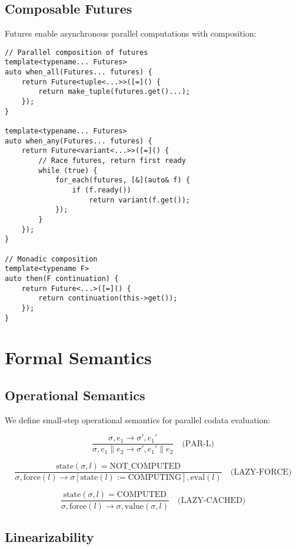 \documentclass[sigconf,review,anonymous]{acmart}
\begin{document}
\subsection{Composable Futures}

Futures enable asynchronous parallel computations with composition:

\begin{lstlisting}
// Parallel composition of futures
template<typename... Futures>
auto when_all(Futures... futures) {
    return Future<tuple<...>>([=]() {
        return make_tuple(futures.get()...);
    });
}

template<typename... Futures>  
auto when_any(Futures... futures) {
    return Future<variant<...>>([=]() {
        // Race futures, return first ready
        while (true) {
            for_each(futures, [&](auto& f) {
                if (f.ready()) 
                    return variant(f.get());
            });
        }
    });
}

// Monadic composition
template<typename F>
auto then(F continuation) {
    return Future<...>([=]() {
        return continuation(this->get());
    });
}
\end{lstlisting}

\section{Formal Semantics}

\subsection{Operational Semantics}

We define small-step operational semantics for parallel codata evaluation:

\[
\frac{\sigma, e_1 \rightarrow \sigma', e_1'}
     {\sigma, e_1 \parallel e_2 \rightarrow \sigma', e_1' \parallel e_2}
\quad \text{(PAR-L)}
\]

\[
\frac{\text{state}(\sigma, l) = \text{NOT\_COMPUTED}}
     {\sigma, \text{force}(l) \rightarrow \sigma[\text{state}(l) := \text{COMPUTING}], \text{eval}(l)}
\quad \text{(LAZY-FORCE)}
\]

\[
\frac{\text{state}(\sigma, l) = \text{COMPUTED}}
     {\sigma, \text{force}(l) \rightarrow \sigma, \text{value}(\sigma, l)}
\quad \text{(LAZY-CACHED)}
\]

\subsection{Linearizability}
\end{document}
